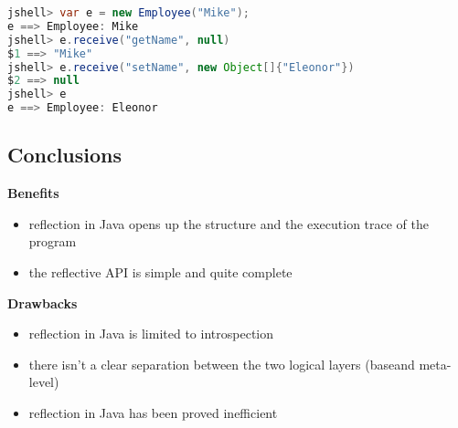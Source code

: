 \begin{lstlisting}[language=Java]
jshell> var e = new Employee("Mike");
e ==> Employee: Mike
jshell> e.receive("getName", null)
$1 ==> "Mike"
jshell> e.receive("setName", new Object[]{"Eleonor"})
$2 ==> null
jshell> e
e ==> Employee: Eleonor
\end{lstlisting}

\subsection{Conclusions}

\textbf{Benefits}
\begin{itemize}
	\item reflection in Java opens up the structure and the execution trace of the program
	\item the reflective API is simple and quite complete
\end{itemize}

\textbf{Drawbacks}
\begin{itemize}
	\item reflection in Java is limited to introspection
	\item there isn’t a clear separation between the two logical layers (baseand meta-level)
	\item reflection in Java has been proved inefficient
\end{itemize}